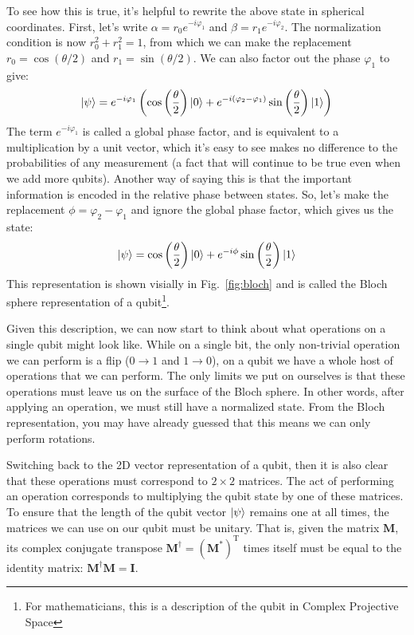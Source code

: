To see how this is true, it's helpful to rewrite the above state in spherical coordinates. First, let's
write $\alpha = r_0e^{-i\varphi_1}$ and $\beta = r_1e^{-i\varphi_2}$. The normalization condition is now
$r_0^2 + r_1^2 = 1$, from which we can make the replacement $r_0 = \cos(\theta/2)$ and $r_1 = \sin(\theta/2)$.
We can also factor out the phase $\varphi_1$ to give:
\begin{equation}
\ket{\psi} = e^{-i\varphi_1}\left(
    \cos\left(\frac{\theta}{2}\right)\ket{0} + e^{-i(\varphi_2 - \varphi_1)}\sin\left(\frac{\theta}{2}\right)\ket{1}
  \right)
\end{equation}
The term $e^{-i\varphi_1}$ is called a global phase factor, and is equivalent to a multiplication by a unit vector,
which it's easy to see makes no difference to the probabilities of any measurement (a fact that will continue to be
true even when we add more qubits). Another way of saying this is that the important information is encoded in
the relative phase between states. So, let's make the replacement $\phi = \varphi_2 - \varphi_1$ and ignore
the global phase factor, which gives us the state:
\begin{equation}
  \ket{\psi} = \cos\left(\frac{\theta}{2}\right)\ket{0} + e^{-i\phi}\sin\left(\frac{\theta}{2}\right)\ket{1}
\end{equation}
This representation is shown visially in Fig.~\ref{fig:bloch} and is called the Bloch sphere representation
of a qubit\footnote{For mathematicians, this is a description of the qubit in Complex Projective Space}.

Given this description, we can now start to think about what operations on a single qubit might look like.
While on a single bit, the only non-trivial operation we can perform is a flip ($0 \rightarrow 1$ and $1 \rightarrow 0$),
on a qubit we have a whole host of operations that we can perform. The only limits we put on ourselves is that these operations
must leave us on the surface of the Bloch sphere. In other words, after applying an operation, we must still
have a normalized state. From the Bloch representation, you may have already guessed that this means we
can only perform rotations.

Switching back to the 2D vector representation of a qubit, then it is also clear that these operations
must correspond to $2\times2$ matrices. The act of performing an operation corresponds to multiplying
the qubit state by one of these matrices. To ensure that the length of the qubit vector $\ket{\psi}$
remains one at all times, the matrices we can use on our qubit must be unitary. That is, given the matrix $\boldsymbol{M}$,
its complex conjugate transpose $\boldsymbol{M}^\dagger = (\boldsymbol{M^{*}})^\mathrm{T}$ times itself must be equal to
the identity matrix: $\boldsymbol{M}^\dagger\boldsymbol{M} = \boldsymbol{I}$.

